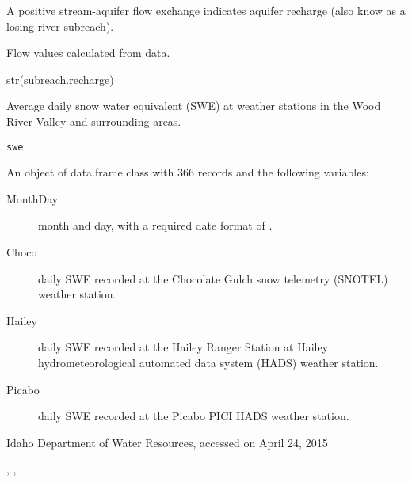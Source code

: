\documentclass[a4paper]{book}
\begin{document}
%
\begin{Details}\relax
A positive stream-aquifer flow exchange indicates aquifer recharge
(also know as a losing river subreach).
\end{Details}
%
\begin{Source}\relax
Flow values calculated from  data.
\end{Source}
%
\begin{Examples}
\begin{ExampleCode}
str(subreach.recharge)

\end{ExampleCode}
\end{Examples}
%
\begin{Description}\relax
Average daily snow water equivalent (SWE) at weather stations in the
Wood River Valley and surrounding areas.
\end{Description}
%
\begin{Usage}
\begin{verbatim}
swe
\end{verbatim}
\end{Usage}
%
\begin{Format}
An object of data.frame class with 366 records and the following variables:
\begin{description}

\item[MonthDay] month and day, with a required date format of .
\item[Choco] daily SWE recorded at the Chocolate Gulch snow telemetry (SNOTEL)
weather station.
\item[Hailey] daily SWE recorded at the Hailey Ranger Station at Hailey
hydrometeorological automated data system (HADS) weather station.
\item[Picabo] daily SWE recorded at the Picabo PICI HADS weather station.

\end{description}
\end{Format}
%
\begin{Source}\relax
Idaho Department of Water Resources, accessed on April 24, 2015
\end{Source}
%
\begin{SeeAlso}\relax
{}, ,
\end{SeeAlso}
\end{document}
